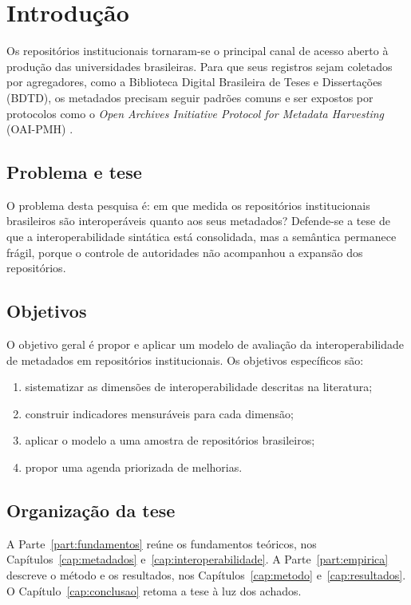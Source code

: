\chapter{Introdução}
\label{cap:introducao}


Os repositórios institucionais tornaram-se o principal canal de acesso aberto à produção das universidades brasileiras. Para que seus registros sejam coletados por agregadores, como a Biblioteca Digital Brasileira de Teses e Dissertações (BDTD), os metadados precisam seguir padrões comuns e ser expostos por protocolos como o \textit{Open Archives Initiative Protocol for Metadata Harvesting} (OAI-PMH) \cite{lagoze2001}.

\section{Problema e tese}

O problema desta pesquisa é: em que medida os repositórios institucionais brasileiros são interoperáveis quanto aos seus metadados? Defende-se a tese de que a interoperabilidade sintática está consolidada, mas a semântica permanece frágil, porque o controle de autoridades não acompanhou a expansão dos repositórios.

\section{Objetivos}
O objetivo geral é propor e aplicar um modelo de avaliação da interoperabilidade de metadados em repositórios institucionais. Os objetivos específicos são:
\begin{enumerate}
  \item sistematizar as dimensões de interoperabilidade descritas na literatura;
  \item construir indicadores mensuráveis para cada dimensão;
  \item aplicar o modelo a uma amostra de repositórios brasileiros;
  \item propor uma agenda priorizada de melhorias.
\end{enumerate}

\section{Organização da tese}
A Parte~\ref{part:fundamentos} reúne os fundamentos teóricos, nos Capítulos~\ref{cap:metadados} e~\ref{cap:interoperabilidade}. A Parte~\ref{part:empirica} descreve o método e os resultados, nos Capítulos~\ref{cap:metodo} e~\ref{cap:resultados}. O Capítulo~\ref{cap:conclusao} retoma a tese à luz dos achados.

